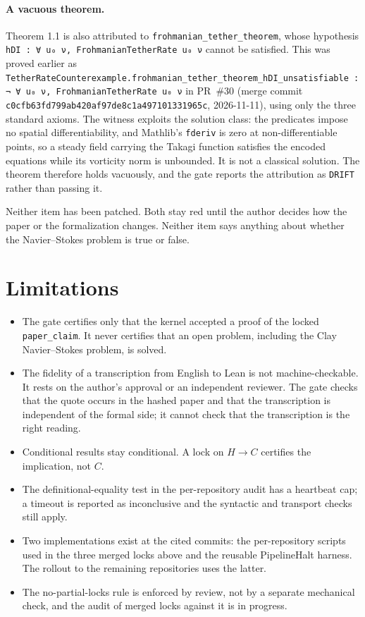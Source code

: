 \documentclass[11pt,a4paper]{article}
\newcommand{\code}[1]{\texttt{#1}}
\begin{document}
\paragraph{A vacuous theorem.} Theorem 1.1 is also attributed to
\code{frohmanian\_tether\_theorem}, whose hypothesis
\code{hDI : ∀ u₀ ν, FrohmanianTetherRate u₀ ν} cannot be satisfied. This was proved earlier as
\code{TetherRateCounterexample.frohmanian\_tether\_theorem\_hDI\_unsatisfiable :
¬ ∀ u₀ ν, FrohmanianTetherRate u₀ ν} in PR~\#30 (merge commit
\code{c0cfb63fd799ab420af97de8c1a497101331965c}, 2026-11-11), using only the three standard
axioms. The witness exploits the solution class: the predicates impose no spatial
differentiability, and Mathlib's \code{fderiv} is zero at non-differentiable points, so a
steady field carrying the Takagi function satisfies the encoded equations while its vorticity
norm is unbounded. It is not a classical solution. The theorem therefore holds vacuously, and
the gate reports the attribution as \code{DRIFT} rather than passing it.

Neither item has been patched. Both stay red until the author decides how the paper or the
formalization changes. Neither item says anything about whether the Navier--Stokes problem is
true or false.

\section{Limitations}
\begin{itemize}
\item The gate certifies only that the kernel accepted a proof of the locked
  \code{paper\_claim}. It never certifies that an open problem, including the Clay
  Navier--Stokes problem, is solved.
\item The fidelity of a transcription from English to Lean is not machine-checkable. It rests
  on the author's approval or an independent reviewer. The gate checks that the quote occurs in
  the hashed paper and that the transcription is independent of the formal side; it cannot
  check that the transcription is the right reading.
\item Conditional results stay conditional. A lock on $H\to C$ certifies the implication, not $C$.
\item The definitional-equality test in the per-repository audit has a heartbeat cap; a timeout
  is reported as inconclusive and the syntactic and transport checks still apply.
\item Two implementations exist at the cited commits: the per-repository scripts used in the
  three merged locks above and the reusable PipelineHalt harness. The rollout to the remaining
  repositories uses the latter.
\item The no-partial-locks rule is enforced by review, not by a separate mechanical check, and
  the audit of merged locks against it is in progress.
\end{itemize}
\end{document}
